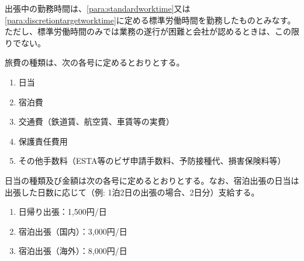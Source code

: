 \documentclass[10pt,a4paper,uplatex]{jsarticle}
\begin{document}
出張中の勤務時間は、\ref{para:standardworktime}又は\ref{para:discretiontargetworktime}に定める標準労働時間を勤務したものとみなす。ただし、標準労働時間のみでは業務の遂行が困難と会社が認めるときは、この限りでない。

旅費の種類は、次の各号に定めるとおりとする。
\begin{enumerate}
    \item 日当
    \item 宿泊費
    \item 交通費（鉄道賃、航空賃、車賃等の実費）
    \item 保護責任費用
    \item その他手数料（ESTA等のビザ申請手数料、予防接種代、損害保険料等）
\end{enumerate}

日当の種類及び金額は次の各号に定めるとおりとする。なお、宿泊出張の日当は出張した日数に応じて（例: 1泊2日の出張の場合、2日分）支給する。
\begin{enumerate}
    \item 日帰り出張：1,500円/日
    \item 宿泊出張（国内）：3,000円/日
    \item 宿泊出張（海外）：8,000円/日
\end{enumerate}
\end{document}
